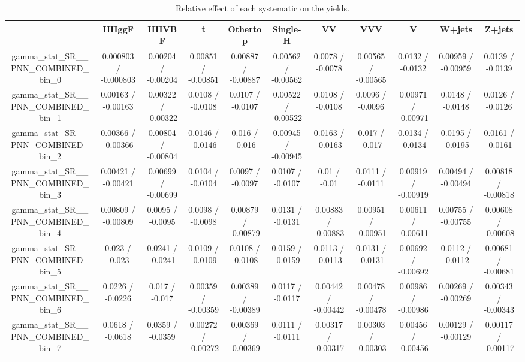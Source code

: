 \documentclass[10pt]{article}
\begin{document}
\begin{table}[htbp]
\begin{center}
\begin{tabular}{|c|c|c|c|c|c|c|c|c|c|c|}
\hline 
      & HHggF      & HHVBF      & t      & Othertop      & Single-H      & VV      & VVV      & V      & W+jets      & Z+jets \\ 
\hline 
  gamma_stat_SR__PNN_COMBINED_bin_0 & 0.000803 / -0.000803 & 0.00204 / -0.00204 & 0.00851 / -0.00851 & 0.00887 / -0.00887 & 0.00562 / -0.00562 & 0.0078 / -0.0078 & 0.00565 / -0.00565 & 0.0132 / -0.0132 & 0.00959 / -0.00959 & 0.0139 / -0.0139 \\ 
  gamma_stat_SR__PNN_COMBINED_bin_1 & 0.00163 / -0.00163 & 0.00322 / -0.00322 & 0.0108 / -0.0108 & 0.0107 / -0.0107 & 0.00522 / -0.00522 & 0.0108 / -0.0108 & 0.0096 / -0.0096 & 0.00971 / -0.00971 & 0.0148 / -0.0148 & 0.0126 / -0.0126 \\ 
  gamma_stat_SR__PNN_COMBINED_bin_2 & 0.00366 / -0.00366 & 0.00804 / -0.00804 & 0.0146 / -0.0146 & 0.016 / -0.016 & 0.00945 / -0.00945 & 0.0163 / -0.0163 & 0.017 / -0.017 & 0.0134 / -0.0134 & 0.0195 / -0.0195 & 0.0161 / -0.0161 \\ 
  gamma_stat_SR__PNN_COMBINED_bin_3 & 0.00421 / -0.00421 & 0.00699 / -0.00699 & 0.0104 / -0.0104 & 0.0097 / -0.0097 & 0.0107 / -0.0107 & 0.01 / -0.01 & 0.0111 / -0.0111 & 0.00919 / -0.00919 & 0.00494 / -0.00494 & 0.00818 / -0.00818 \\ 
  gamma_stat_SR__PNN_COMBINED_bin_4 & 0.00809 / -0.00809 & 0.0095 / -0.0095 & 0.0098 / -0.0098 & 0.00879 / -0.00879 & 0.0131 / -0.0131 & 0.00883 / -0.00883 & 0.00951 / -0.00951 & 0.00611 / -0.00611 & 0.00755 / -0.00755 & 0.00608 / -0.00608 \\ 
  gamma_stat_SR__PNN_COMBINED_bin_5 & 0.023 / -0.023 & 0.0241 / -0.0241 & 0.0109 / -0.0109 & 0.0108 / -0.0108 & 0.0159 / -0.0159 & 0.0113 / -0.0113 & 0.0131 / -0.0131 & 0.00692 / -0.00692 & 0.0112 / -0.0112 & 0.00681 / -0.00681 \\ 
  gamma_stat_SR__PNN_COMBINED_bin_6 & 0.0226 / -0.0226 & 0.017 / -0.017 & 0.00359 / -0.00359 & 0.00389 / -0.00389 & 0.0117 / -0.0117 & 0.00442 / -0.00442 & 0.00478 / -0.00478 & 0.00986 / -0.00986 & 0.00269 / -0.00269 & 0.00343 / -0.00343 \\ 
  gamma_stat_SR__PNN_COMBINED_bin_7 & 0.0618 / -0.0618 & 0.0359 / -0.0359 & 0.00272 / -0.00272 & 0.00369 / -0.00369 & 0.0111 / -0.0111 & 0.00317 / -0.00317 & 0.00303 / -0.00303 & 0.00456 / -0.00456 & 0.00129 / -0.00129 & 0.00117 / -0.00117 \\ 
\hline 
\end{tabular} 
\caption{Relative effect of each systematic on the yields.} 
\end{center} 
\end{table} 
\end{document}
